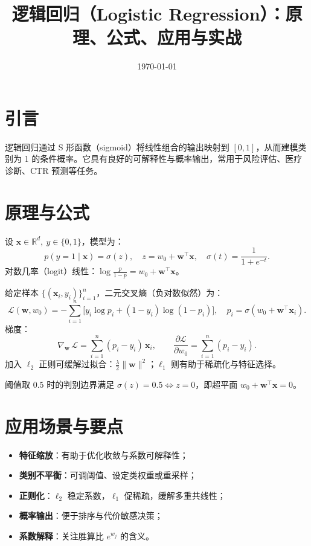 \documentclass[UTF8,zihao=-4]{ctexart}
\title{逻辑回归（Logistic Regression）：原理、公式、应用与实战}
\author{}
\date{\today}
\begin{document}
\maketitle

\section{引言}
逻辑回归通过 S 形函数（sigmoid）将线性组合的输出映射到 $[0,1]$，从而建模类别为 1 的条件概率。它具有良好的可解释性与概率输出，常用于风险评估、医疗诊断、CTR 预测等任务。

\section{原理与公式}
设 $\bm{x}\in\mathbb{R}^d,\ y\in\{0,1\}$，模型为：
\begin{equation}
  p(y=1\mid \bm{x}) = \sigma(z),\quad z = w_0 + \bm{w}^\top \bm{x},\quad \sigma(t) = \frac{1}{1+e^{-t}}.
\end{equation}
对数几率（logit）线性：$\log \tfrac{p}{1-p} = w_0 + \bm{w}^\top \bm{x}$。

给定样本 $\{(\bm{x}_i,y_i)\}_{i=1}^n$，二元交叉熵（负对数似然）为：
\begin{equation}
  \mathcal{L}(\bm{w},w_0) = -\sum_{i=1}^n \big[y_i\log p_i + (1-y_i)\log (1-p_i)\big],\quad p_i=\sigma(w_0+\bm{w}^\top\bm{x}_i).
\end{equation}
梯度：
\begin{equation}
  \nabla_{\bm{w}}\,\mathcal{L} = \sum_{i=1}^n (p_i - y_i)\,\bm{x}_i,\qquad \frac{\partial\mathcal{L}}{\partial w_0} = \sum_{i=1}^n (p_i - y_i).
\end{equation}
加入 $\ell_2$ 正则可缓解过拟合：$\tfrac{\lambda}{2}\lVert\bm{w}\rVert^2$；$\ell_1$ 则有助于稀疏化与特征选择。

阈值取 $0.5$ 时的判别边界满足 $\sigma(z)=0.5\iff z=0$，即超平面 $w_0+\bm{w}^\top\bm{x}=0$。

\section{应用场景与要点}
\begin{itemize}
  \item \textbf{特征缩放}：有助于优化收敛与系数可解释性；
  \item \textbf{类别不平衡}：可调阈值、设定类权重或重采样；
  \item \textbf{正则化}：$\ell_2$ 稳定系数，$\ell_1$ 促稀疏，缓解多重共线性；
  \item \textbf{概率输出}：便于排序与代价敏感决策；
  \item \textbf{系数解释}：关注胜算比 $e^{w_j}$ 的含义。
\end{itemize}
\end{document}
